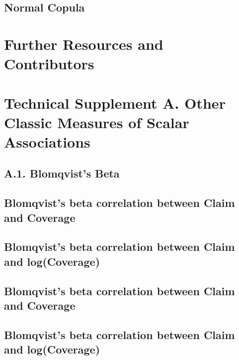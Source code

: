 \documentclass[]{book}
\theoremstyle{definition}
\theoremstyle{definition}
\theoremstyle{definition}
\theoremstyle{remark}
\begin{document}
\subsection{Normal Copula}\label{normal-copula-1}

\section{Further Resources and
Contributors}\label{Dep:further-reading-and-resources}

\section*{Technical Supplement A. Other Classic Measures of Scalar
Associations}\label{technical-supplement-a.-other-classic-measures-of-scalar-associations}

\subsection*{A.1. Blomqvist's Beta}\label{a.1.-blomqvists-beta}

\subsection{Blomqvist's beta correlation between Claim and
Coverage}\label{blomqvists-beta-correlation-between-claim-and-coverage}

\subsection{Blomqvist's beta correlation between Claim and
log(Coverage)}\label{blomqvists-beta-correlation-between-claim-and-logcoverage}

\subsection{Blomqvist's beta correlation between Claim and
Coverage}\label{blomqvists-beta-correlation-between-claim-and-coverage-1}

\subsection{Blomqvist's beta correlation between Claim and
log(Coverage)}\label{blomqvists-beta-correlation-between-claim-and-logcoverage-1}
\end{document}
